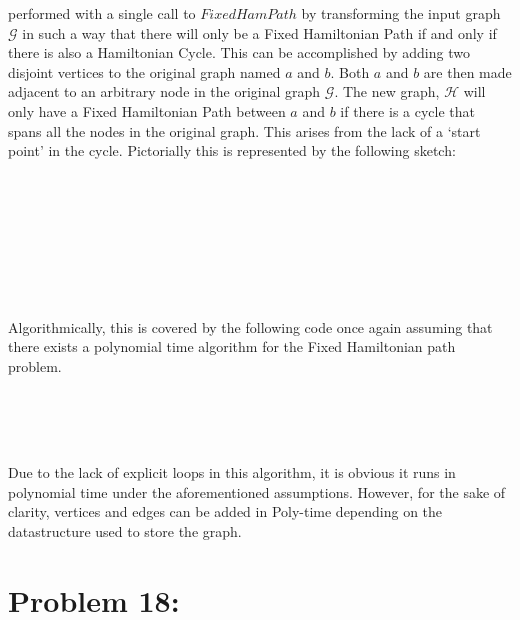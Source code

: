 \documentclass[12pt]{article}
\begin{document}
performed with a single call to $FixedHamPath$ by transforming the
input graph $\mathcal{G}$ in such a way that there will only be a
Fixed Hamiltonian Path if and only if there is also a Hamiltonian 
Cycle.  This can be accomplished by adding two disjoint vertices
to the original graph named $a$ and $b$.  Both $a$ and $b$ are then
made adjacent to an arbitrary node in the original graph $\mathcal{G}$.
The new graph, $\mathcal{H}$ will only have a Fixed Hamiltonian Path
between $a$ and $b$ if there is a cycle that spans all the nodes in
the original graph.  This arises from the lack of a `start point' in
the cycle.  Pictorially this is represented by the following
sketch:\\\\\\\\\\\\\\\\\\   

Algorithmically, this is covered by the following code once again
assuming that there exists a polynomial time algorithm for the
Fixed Hamiltonian path problem.\\\\ 
\begin{algorithm}[H]
\\
\\
\end{algorithm}
Due to the lack of explicit loops in this algorithm, it is obvious it
runs in polynomial time under the aforementioned assumptions.  However,
for the sake of clarity, vertices and edges can be added in Poly-time
depending on the datastructure used to store the graph.
\section*{Problem 18: }
\end{document}
